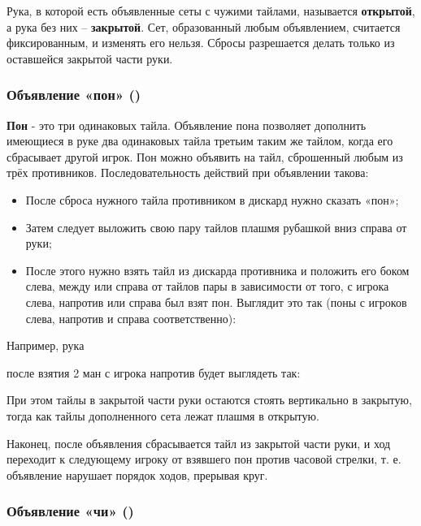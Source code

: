 Рука, в которой есть объявленные сеты с чужими тайлами, называется \textbf{открытой}, а рука без них – \textbf{закрытой}. Сет, образованный любым объявлением, считается фиксированным, и изменять его нельзя. Сбросы разрешается делать только из оставшейся закрытой части руки.

\subsubsection{Объявление «пон» ()}

\textbf{Пон} - это три одинаковых тайла. Объявление пона позволяет дополнить имеющиеся в руке два одинаковых тайла третьим таким же тайлом, когда его сбрасывает другой игрок. Пон можно объявить на тайл, сброшенный любым из трёх противников. Последовательность действий при объявлении такова:

\begin{itemize}
	\item После сброса нужного тайла противником в дискард нужно сказать «пон»;
	\item Затем следует выложить свою пару тайлов плашмя рубашкой вниз справа от руки;
	\item После этого нужно взять тайл из дискарда противника и положить его боком слева, между или справа от тайлов пары в зависимости от того, с игрока слева, напротив или справа был взят пон. Выглядит это так (поны с игроков слева, напротив и справа соответственно):
\end{itemize}


Например, рука


после взятия 2 ман с игрока напротив будет выглядеть так:

 \hfill {}

При этом тайлы в закрытой части руки остаются стоять вертикально в закрытую, тогда как тайлы дополненного сета лежат плашмя в открытую.

Наконец, после объявления сбрасывается тайл из закрытой части руки, и ход переходит к следующему игроку от взявшего пон против часовой стрелки, т. е. объявление нарушает порядок ходов, прерывая круг.

\subsubsection{Объявление «чи» ()}

